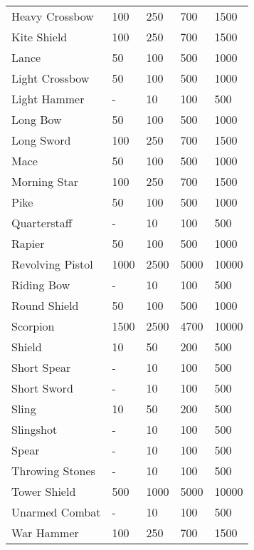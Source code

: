 \begin{longtable}{l | p{1.75cm} | p{1.75cm} | p{1.75cm} | p{1.75cm}}
	Heavy Crossbow & 100 & 250 & 700 & 1500 \\
	
	Kite Shield & 100 & 250 & 700 & 1500 \\
	
	Lance & 50 & 100 & 500 & 1000\\
	
	Light Crossbow & 50 & 100 & 500 & 1000\\
	
	Light Hammer & - & 10 & 100 & 500\\
	
	Long Bow & 50 & 100 & 500 & 1000\\
	
	Long Sword & 100 & 250 & 700 & 1500 \\
	
	Mace & 50 & 100 & 500 & 1000\\
	
	Morning Star & 100 & 250 & 700 & 1500 \\
	
	Pike & 50 & 100 & 500 & 1000\\
	
	Quarterstaff & - & 10 & 100 & 500\\
	
	Rapier & 50 & 100 & 500 & 1000\\
	
	Revolving Pistol & 1000 & 2500 & 5000 & 10000\\
	
	Riding Bow & - & 10 & 100 & 500\\
	
	Round Shield & 50 & 100 & 500 & 1000\\
	
	Scorpion & 1500 & 2500 & 4700 & 10000 \\
	
	Shield & 10 & 50 & 200 & 500\\
	
	Short Spear & - & 10 & 100 & 500\\
	
	Short Sword & - & 10 & 100 & 500\\
	
	Sling & 10 & 50 & 200 & 500\\
	
	Slingshot & - & 10 & 100 & 500\\
	
	Spear & - & 10 & 100 & 500\\
	
	Throwing Stones & - & 10 & 100 & 500\\
	
	Tower Shield & 500 & 1000 & 5000 & 10000\\
	
	Unarmed Combat & - & 10 & 100 & 500\\
	
	War Hammer & 100 & 250 & 700 & 1500 \\
\end{longtable}


